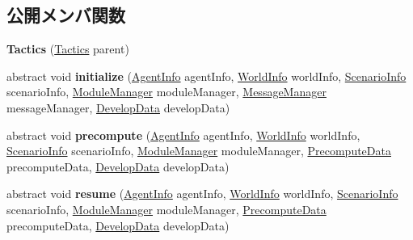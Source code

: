 \subsection*{公開メンバ関数}
\begin{DoxyCompactItemize}
\item 
\hypertarget{classadf_1_1component_1_1tactics_1_1Tactics_ad864f728a03d54625cb0ce2847275993}{}\label{classadf_1_1component_1_1tactics_1_1Tactics_ad864f728a03d54625cb0ce2847275993} 
{\bfseries Tactics} (\hyperlink{classadf_1_1component_1_1tactics_1_1Tactics}{Tactics} parent)
\item 
\hypertarget{classadf_1_1component_1_1tactics_1_1Tactics_aa236f190e357a9a70a9f05605c519a44}{}\label{classadf_1_1component_1_1tactics_1_1Tactics_aa236f190e357a9a70a9f05605c519a44} 
abstract void {\bfseries initialize} (\hyperlink{classadf_1_1agent_1_1info_1_1AgentInfo}{Agent\+Info} agent\+Info, \hyperlink{classadf_1_1agent_1_1info_1_1WorldInfo}{World\+Info} world\+Info, \hyperlink{classadf_1_1agent_1_1info_1_1ScenarioInfo}{Scenario\+Info} scenario\+Info, \hyperlink{classadf_1_1agent_1_1module_1_1ModuleManager}{Module\+Manager} module\+Manager, \hyperlink{classadf_1_1agent_1_1communication_1_1MessageManager}{Message\+Manager} message\+Manager, \hyperlink{classadf_1_1agent_1_1develop_1_1DevelopData}{Develop\+Data} develop\+Data)
\item 
\hypertarget{classadf_1_1component_1_1tactics_1_1Tactics_a33456cbfd2e89a26b7e3ca4b0d19f2f4}{}\label{classadf_1_1component_1_1tactics_1_1Tactics_a33456cbfd2e89a26b7e3ca4b0d19f2f4} 
abstract void {\bfseries precompute} (\hyperlink{classadf_1_1agent_1_1info_1_1AgentInfo}{Agent\+Info} agent\+Info, \hyperlink{classadf_1_1agent_1_1info_1_1WorldInfo}{World\+Info} world\+Info, \hyperlink{classadf_1_1agent_1_1info_1_1ScenarioInfo}{Scenario\+Info} scenario\+Info, \hyperlink{classadf_1_1agent_1_1module_1_1ModuleManager}{Module\+Manager} module\+Manager, \hyperlink{classadf_1_1agent_1_1precompute_1_1PrecomputeData}{Precompute\+Data} precompute\+Data, \hyperlink{classadf_1_1agent_1_1develop_1_1DevelopData}{Develop\+Data} develop\+Data)
\item 
\hypertarget{classadf_1_1component_1_1tactics_1_1Tactics_a751ccc020f8d67df919cc5c9cd6fa298}{}\label{classadf_1_1component_1_1tactics_1_1Tactics_a751ccc020f8d67df919cc5c9cd6fa298} 
abstract void {\bfseries resume} (\hyperlink{classadf_1_1agent_1_1info_1_1AgentInfo}{Agent\+Info} agent\+Info, \hyperlink{classadf_1_1agent_1_1info_1_1WorldInfo}{World\+Info} world\+Info, \hyperlink{classadf_1_1agent_1_1info_1_1ScenarioInfo}{Scenario\+Info} scenario\+Info, \hyperlink{classadf_1_1agent_1_1module_1_1ModuleManager}{Module\+Manager} module\+Manager, \hyperlink{classadf_1_1agent_1_1precompute_1_1PrecomputeData}{Precompute\+Data} precompute\+Data, \hyperlink{classadf_1_1agent_1_1develop_1_1DevelopData}{Develop\+Data} develop\+Data)

\end{DoxyCompactItemize}
